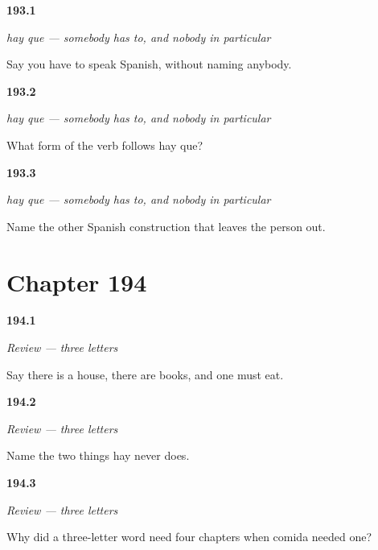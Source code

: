 \noindent\begin{minipage}[t]{\linewidth}
\raggedright
\hypertarget{review-ES-C54-hay-que-say}{\textbf{193.1}} \emph{hay que — somebody has to, and nobody in particular}\par
\small Say you have to speak Spanish, without naming anybody.
\end{minipage}\par\medskip

\noindent\begin{minipage}[t]{\linewidth}
\raggedright
\hypertarget{review-ES-C54-hay-que-form}{\textbf{193.2}} \emph{hay que — somebody has to, and nobody in particular}\par
\small What form of the verb follows hay que?
\end{minipage}\par\medskip

\noindent\begin{minipage}[t]{\linewidth}
\raggedright
\hypertarget{review-ES-C54-hay-que-pair}{\textbf{193.3}} \emph{hay que — somebody has to, and nobody in particular}\par
\small Name the other Spanish construction that leaves the person out.
\end{minipage}\par\medskip

\section*{Chapter 194}

\noindent\begin{minipage}[t]{\linewidth}
\raggedright
\hypertarget{review-ES-C54-repaso-hay-three}{\textbf{194.1}} \emph{Review — three letters}\par
\small Say there is a house, there are books, and one must eat.
\end{minipage}\par\medskip

\noindent\begin{minipage}[t]{\linewidth}
\raggedright
\hypertarget{review-ES-C54-repaso-hay-never}{\textbf{194.2}} \emph{Review — three letters}\par
\small Name the two things hay never does.
\end{minipage}\par\medskip

\noindent\begin{minipage}[t]{\linewidth}
\raggedright
\hypertarget{review-ES-C54-repaso-hay-small}{\textbf{194.3}} \emph{Review — three letters}\par
\small Why did a three-letter word need four chapters when comida needed one?
\end{minipage}\par\medskip

